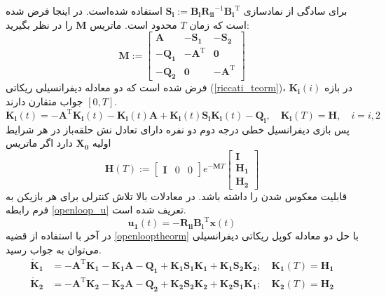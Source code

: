 برای سادگی از نمادسازی 
$\boldsymbol{S_i} := \boldsymbol{B_iR_{ii}}^{-1}\boldsymbol{B_i}^\mathrm{T}$
استفاده شده‌است. در اینجا فرض شده است که زمان $T$ محدود است.
 \label{openlooptheorm}
ماتریس
$\boldsymbol{M}$ را در نظر بگیرید:
\begin{equation}
	\boldsymbol{M} :=
	\begin{bmatrix}
		\boldsymbol{A} & -\boldsymbol{S_1} & -\boldsymbol{S_2}\\
		-\boldsymbol{Q_1} & -\boldsymbol{A}^\mathrm{T}& \boldsymbol{0}\\
		-\boldsymbol{Q_2} & \boldsymbol{0} & -\boldsymbol{A}^\mathrm{T}
	\end{bmatrix}
\end{equation}
فرض شده ‌است که دو معادله دیفرانسیلی ریکاتی
(\ref{riccati_teorm})، $\boldsymbol{K_i}(i)$ 
 در بازه
$[0, T]$
جواب متقارن دارند.
\begin{equation}\label{riccati_teorm}
	\boldsymbol{\dot{K}_i}(t) = -\boldsymbol{A}^\mathrm{T}\boldsymbol{K_i}(t)-\boldsymbol{K_i}(t)\boldsymbol{A}+\boldsymbol{K_i}(t)\boldsymbol{S_iK_i}(t)-\boldsymbol{Q_i},\quad \boldsymbol{K_i}(T) = \boldsymbol{H},\quad i = i, 2
\end{equation}
\newpage
پس بازی دیفرانسیل خطی درجه دوم دو نفره دارای تعادل نش حلقه‌باز در هر شرایط اولیه $\boldsymbol{X_0}
$
دارد اگر ماتریس
\begin{equation}
	\boldsymbol{H}(T) := \begin{bmatrix}
		\boldsymbol{I}&0&0
	\end{bmatrix}
e^{-\boldsymbol{M}T}
\begin{bmatrix}
	\boldsymbol{I}
	\\ \boldsymbol{H_{1}}
	\\ \boldsymbol{H_{2}}
\end{bmatrix}
\end{equation}
قابلیت معکوس شدن را  داشته‌ باشد.
در معادلات بالا تلاش کنترلی برای هر بازیکن به فرم رابطه \ref{openloop_u} تعریف شده است.
\begin{equation}\label{openloop_u}
	\boldsymbol{u_1}(t) = -\boldsymbol{R_{ii}}\boldsymbol{B_i}^\mathrm{T}\boldsymbol{x}(t)
\end{equation}
در آخر با استفاده از قضیه
 \ref{openlooptheorm}
با حل دو معادله کوپل ریکاتی دیفرانسیلی می‌توان به جواب رسید.
\begin{align}
	\boldsymbol{\dot{K}_1} &= -\boldsymbol{A}^\mathrm{T}\boldsymbol{K_1} - \boldsymbol{K_1A} - \boldsymbol{Q_1} +\boldsymbol{K_1S_1K_1} + \boldsymbol{K_1S_2K_2};\quad \boldsymbol{K_1}(T) = \boldsymbol{H_1}\\
	\boldsymbol{\dot{K}_2} &= -\boldsymbol{A}^\mathrm{T}\boldsymbol{K_2} - \boldsymbol{K_2A} - \boldsymbol{Q_2} +\boldsymbol{K_2S_2K_2} + \boldsymbol{K_2S_1K_1};\quad \boldsymbol{K_2}(T) = \boldsymbol{H_2}
\end{align}

